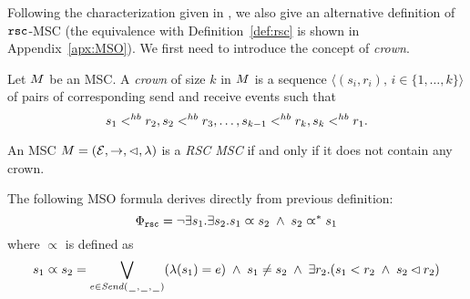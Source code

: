 Following the characterization given in \cite[Theorem 4.4]{DBLP:journals/dc/Charron-BostMT96}, we also give an alternative definition of $\mathtt{rsc}$-MSC (the equivalence with Definition~\ref{def:rsc} is shown in Appendix~\ref{apx:MSO}). We first need to introduce the concept of \emph{crown}.

\begin{definition} [crown]
	Let $M$ be an MSC. A \emph{crown} of size $k$ in $M$ is a sequence $\langle(s_i,r_i),\, i \in \{1,\dots,k\}\rangle$ of pairs of corresponding send and receive events such that
	\[
		s_1 <^{hb} r_2, s_2 <^{hb} r_3, \dots, s_{k-1} <^{hb} r_k, s_k <^{hb} r_1.
	\]
\end{definition}

\begin{definition} \label{def:rsc_alt}
	An MSC $M = (\mathcal{E},\to,\lhd,\lambda)$ is a \emph{RSC MSC} if and only if it does not contain any crown.
\end{definition}


The following MSO formula derives directly from previous  definition:
\[\Phi_{\mathtt{rsc}} = \neg \exists s_1.\exists s_2. s_1 \varpropto s_2 \;\wedge\; s_2 \varpropto^\ast s_1
\]
\noindent where $\varpropto$ is defined as
\[
s_1 \varpropto s_2 =
\bigvee_{\substack{e \in {\mathit{Send}(\hspace{0.1em}\underline{\hspace{0.5em}}\hspace{0.1em},\hspace{0.1em}\underline{\hspace{0.5em}}\hspace{0.1em},\hspace{0.1em}\underline{\hspace{0.5em}}\hspace{0.1em})}}}(\lambda(s_1) = e) \;\wedge\;
s_1 \neq s_2 \;\wedge\;
\exists r_2. (s_1 < r_2 \;\wedge\; s_2 \lhd r_2)
\]




